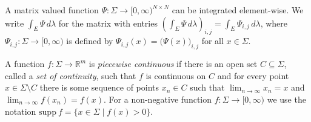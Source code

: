 \documentclass[a4paper,UKenglish,cleveref, autoref,mathscr, amsthm, thmtools, thm-restate]{lipics-v2019}
\newcommand{\RR}{\mathbb{R}}
\newcommand{\1}{\mathbb{I}}
\newcommand{\supp}{\mathrm{supp}}
\begin{document}
A matrix valued function $\Psi : \Sigma \rightarrow [0,\infty)^{N \times N}$ can be integrated element-wise.
We write $\int_E \Psi\,d\lambda$ for the matrix with entries $\left( \int_E \Psi\, d\lambda \right)_{i,j} = \int_E \Psi_{i,j}\, d\lambda$, where $\Psi_{i,j} : \Sigma \rightarrow [0,\infty)$ is defined by $\Psi_{i,j}(x) = \big( \Psi(x) \big)_{i,j}$ for all $x \in \Sigma$.


A function $f : \Sigma \rightarrow \RR^m$ is \emph{piecewise continuous} if there is an open set $C \subseteq \Sigma$, called a \emph{set of continuity}, such that $f$ is continuous on $C$ and for every point $x \in  \Sigma \setminus C$ there is some sequence of points $x_n \in C$ such that $\lim_{n \rightarrow \infty} x_n = x$ and $\lim_{n \rightarrow \infty} f(x_n) = f(x)$. For a non-negative function $f : \Sigma \rightarrow [0,\infty)$ we use the notation ${\supp~f = \{x \in \Sigma \mid f(x) > 0\}}$.
\end{document}
